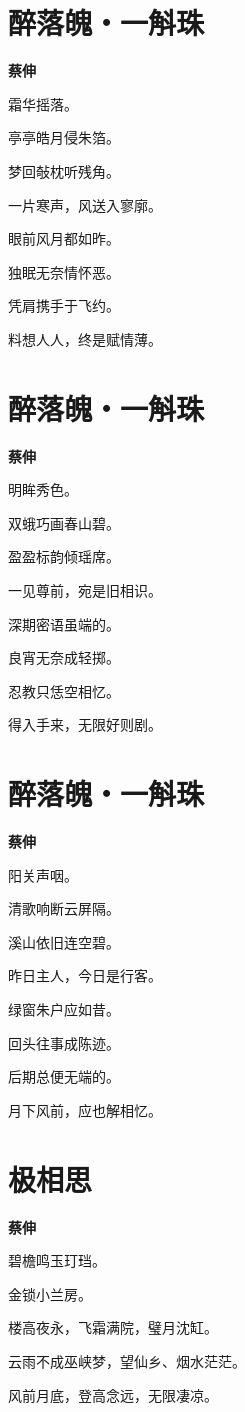 \documentclass[12pt,a4paper]{ctexbook}
\begin{document}
\section{醉落魄・一斛珠}
\textbf{蔡伸}\par\vspace{0.5em}
霜华摇落。\par
亭亭皓月侵朱箔。\par
梦回敧枕听残角。\par
一片寒声，风送入寥廓。\par
眼前风月都如昨。\par
独眠无奈情怀恶。\par
凭肩携手于飞约。\par
料想人人，终是赋情薄。\par

\section{醉落魄・一斛珠}
\textbf{蔡伸}\par\vspace{0.5em}
明眸秀色。\par
双蛾巧画春山碧。\par
盈盈标韵倾瑶席。\par
一见尊前，宛是旧相识。\par
深期密语虽端的。\par
良宵无奈成轻掷。\par
忍教只恁空相忆。\par
得入手来，无限好则剧。\par

\section{醉落魄・一斛珠}
\textbf{蔡伸}\par\vspace{0.5em}
阳关声咽。\par
清歌响断云屏隔。\par
溪山依旧连空碧。\par
昨日主人，今日是行客。\par
绿窗朱户应如昔。\par
回头往事成陈迹。\par
后期总便无端的。\par
月下风前，应也解相忆。\par

\section{极相思}
\textbf{蔡伸}\par\vspace{0.5em}
碧檐鸣玉玎珰。\par
金锁小兰房。\par
楼高夜永，飞霜满院，璧月沈缸。\par
云雨不成巫峡梦，望仙乡、烟水茫茫。\par
风前月底，登高念远，无限凄凉。\par
\end{document}
